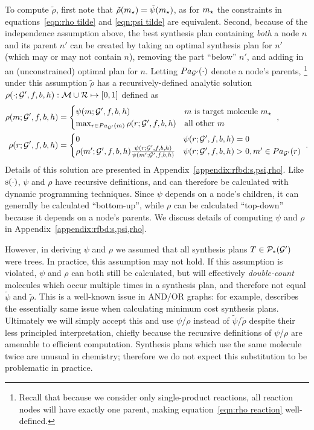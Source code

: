 To compute $\tilde\rho$, first note that $\tilde\rho(m_\star)=\tilde\psi(m_\star)$,
as for $m_\star$ the constraints in equations~\ref{eqn:rho tilde}
and \ref{eqn:psi tilde} are equivalent.
Second, because of the independence assumption above,
the best synthesis plan containing \emph{both} a node $n$ and its parent $n'$
can be created by taking an optimal synthesis plan for $n'$ (which may or may not contain $n$),
removing the part ``below'' $n'$, and adding in an (unconstrained) optimal plan for $n$.
Letting $Pa_{{\mathcal{G}}'}(\cdot)$ denote a node's parents,%
\footnote{
    Recall that because we 
    consider only single-product reactions,
    all reaction nodes will have exactly one parent,
    making equation~\ref{eqn:rho reaction} well-defined.
}
under this assumption $\tilde\rho$
has a recursively-defined analytic solution
$\rho(\cdot;{\mathcal{G}}',f,b,h):{\mathcal{M}}\cup{\mathcal{R}}\mapsto[0,1]$ defined as
\begin{align}
     \rho(m;{\mathcal{G}}',f,b,h) &= \begin{cases}
    \psi(m;{\mathcal{G}}',f,b,h) & m\text{ is target molecule }m_\star \\
    \max_{r\in Pa_{{\mathcal{G}}'}(m)}\rho(r;{\mathcal{G}}',f,b,h) & \text{all other }m \\
    \end{cases}\ , \label{eqn:rho molecule} \\
    \rho(r;{\mathcal{G}}',f,b,h) &= \begin{cases}
        0 & \psi(r;{\mathcal{G}}',f,b,h) = 0 \\
        \rho(m';{\mathcal{G}}',f,b,h) \frac{\psi(r;{\mathcal{G}}',f,b,h)}{\psi(m';{\mathcal{G}}',f,b,h)} & \psi(r;{\mathcal{G}}',f,b,h) > 0, m'\in Pa_{{\mathcal{G}}'}(r)
    \end{cases}\ .
    \label{eqn:rho reaction}
\end{align}
Details of this solution are presented in Appendix~\ref{appendix:rfbd:s,psi,rho}.
Like ${\textnormal{s}}(\cdot)$,
$\psi$ and $\rho$ have recursive definitions,
and can therefore be calculated with dynamic programming techniques.
Since $\psi$ depends on a node's children, it can generally be calculated
``bottom-up'',
while $\rho$ can be calculated ``top-down'' because it depends on a node's parents.
We discuss details of computing $\psi$ and $\rho$ in Appendix~\ref{appendix:rfbd:s,psi,rho}.


However, in deriving $\psi$ and $\rho$
we assumed that all synthesis plans
$T\in\mathcal{P}_{*}({\mathcal{G}}')$ were trees.
In practice, this assumption may not hold.
If this assumption is violated,
$\psi$ and $\rho$ can both still be calculated,
but will effectively \emph{double-count} molecules which occur multiple times in a synthesis plan,
and therefore not equal $\tilde\psi$ and $\tilde\rho$.
This is a well-known issue in AND/OR graphs:
for example,
\citet[page 102]{nilsson1982principles}
describes the essentially same issue when calculating minimum cost synthesis plans.
Ultimately we will simply accept this and use 
$\psi$/$\rho$ instead of
$\tilde\psi$/$\tilde\rho$
despite their less principled interpretation,
chiefly because the recursive definitions of $\psi$/$\rho$ are amenable to efficient computation.
Synthesis plans which use the same molecule twice
are unusual in chemistry;
therefore we do not expect this substitution to be problematic in practice.


